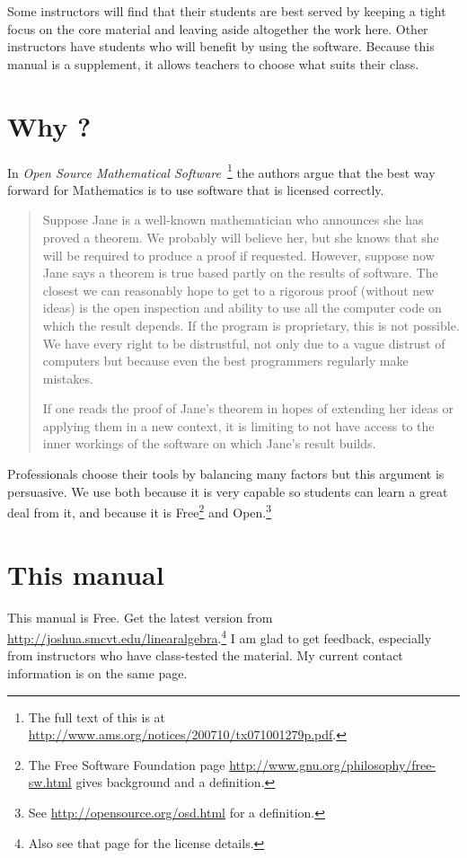Some instructors will find that their students are best served by
keeping a tight focus on the
core material and leaving aside altogether 
the work here. 
Other instructors
have students who will benefit by using the software.
Because this manual is a supplement, it allows 
teachers to choose what suits their class.


\section{Why \Sage?}
In 
\textit{Open Source Mathematical Software\,} \citep{JoynerStein07}\footnote{The full text of this is at
\protect\url{http://www.ams.org/notices/200710/tx071001279p.pdf}.}
the authors argue that the best way forward for Mathematics 
is to use software that is licensed correctly.

\begin{quotation}\small
Suppose Jane is a well-known mathematician who announces
she has proved a theorem. We probably will believe
her, but she knows that she will be required to produce
a proof if requested. However, suppose now Jane says a
theorem is true based partly on the results of software. The
closest we can reasonably hope to get to a rigorous proof
(without new ideas) is the open inspection and ability to use
all the computer code on which the result depends. If the
program is proprietary, this is not possible. We have every
right to be distrustful, not only due to a vague distrust of
computers but because even the best programmers regularly
make mistakes.

If one reads the proof of Jane’s theorem in hopes of
extending her ideas or applying them in a new context, it
is limiting to not have access to the inner workings of the
software on which Jane’s result builds.
\end{quotation}  
Professionals choose their tools by balancing many factors but
this argument is persuasive.
We use \Sage{} both because it is very capable 
so students can 
learn a great deal from it,
and because it is 
Free\footnote{The Free Software Foundation page 
\protect\url{http://www.gnu.org/philosophy/free-sw.html} 
gives background and a definition.} 
and Open.\footnote{See \protect\url{http://opensource.org/osd.html} 
for a definition.} 



\section{This manual}
This manual is Free.
Get the latest version from 
\url{http://joshua.smcvt.edu/linearalgebra}.\footnote{%
  Also see that page for the license details.}
I am glad to get feedback, especially from instructors
who have class-tested the material.
My current contact information is on the same page.

